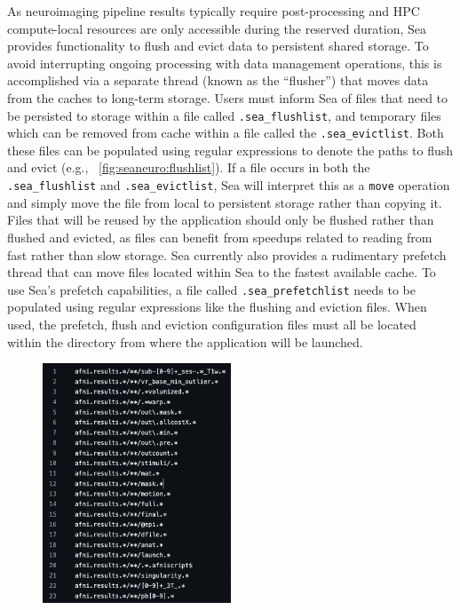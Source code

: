 \documentclass[pdflatex,sn-mathphys-num]{sn-jnl}
\theoremstyle{thmstyleone}%
\theoremstyle{thmstyletwo}%
\theoremstyle{thmstylethree}%
\begin{document}
    As neuroimaging pipeline results typically require post-processing and
    HPC compute-local resources are only accessible during the reserved
    duration, Sea provides functionality to flush and evict data to persistent
    shared storage. To avoid interrupting ongoing
    processing with data management operations, this is accomplished via a separate thread (known as the
    ``flusher'') that moves data from the caches to long-term storage. Users must inform Sea of files
    that need to be persisted to storage within a file called
    \texttt{.sea\_flushlist}, and temporary files which can be removed from
    cache within a file called the \texttt{.sea\_evictlist}. Both these files
    can be populated using regular expressions to denote the paths to flush and
    evict (e.g., ~\autoref{fig:seaneuro:flushlist}). If a file occurs in both the \texttt{.sea\_flushlist} and
    \texttt{.sea\_evictlist}, Sea will interpret this as a \texttt{move}
    operation and simply move the file from local to persistent storage rather
    than copying it. Files that will be reused by the application should only be
    flushed rather than flushed and evicted, as files can benefit from speedups
    related to reading from fast rather than slow storage. Sea currently also
    provides a rudimentary prefetch thread that can move files located within
    Sea to the fastest available cache. To use Sea's prefetch
    capabilities, a file called \texttt{.sea\_prefetchlist} needs to be
    populated using regular expressions like the flushing and eviction files.
    When used, the prefetch, flush and eviction configuration files must all be located within the directory from where the application will be launched.

    \begin{figure}
      \centering
      \includegraphics[width=0.5\textwidth]{figures/ex_flushlist.png}
       \captionsetup{justification=centering}
    \label{fig:seaneuro:flushlist}
    \end{figure}
    
\end{document}
